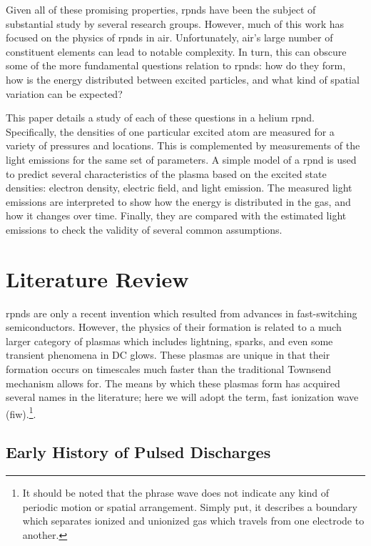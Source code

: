 Given all of these promising properties, \acs{rpnd}s have been the subject of
substantial study by several research groups. However, much of this work has
focused on the physics of \acs{rpnd}s in air. Unfortunately, air's large number
of constituent elements can lead to notable complexity. In turn, this can
obscure some of the more fundamental questions relation to \acs{rpnd}s: how do
they form, how is the energy distributed between excited particles, and what
kind of spatial variation can be expected?

This paper details a study of each of these questions in a helium \acs{rpnd}.
Specifically, the densities of one particular excited atom are measured for a
variety of pressures and locations. This is complemented by measurements of the
light emissions for the same set of parameters. A simple model of a \acs{rpnd}
is used to predict several characteristics of the plasma based on the excited
state densities: electron density, electric field, and light emission. The
measured light emissions are interpreted to show how the energy is distributed
in the gas, and how it changes over time. Finally, they are compared with the
estimated light emissions to check the validity of several common assumptions.

\section{Literature Review}

\acs{rpnd}s are only a recent invention which resulted from advances in
fast-switching semiconductors. However, the physics of their formation is
related to a much larger category of plasmas which includes lightning, sparks,
and even some transient phenomena in DC glows. These plasmas are unique in that
their formation occurs on timescales much faster than the traditional Townsend
mechanism allows for. The means by which these plasmas form has acquired several
names in the literature; here we will adopt the term, fast ionization wave
(\acs{fiw}).\footnote{It should be noted that the phrase wave does not indicate
any kind of periodic motion or spatial arrangement. Simply put, it describes a
boundary which separates ionized and unionized gas which travels from one
electrode to another.}.

\subsection{Early History of Pulsed Discharges}

